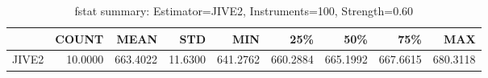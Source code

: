 \begin{table}[ht]
\centering
\caption{fstat summary: Estimator=JIVE2, Instruments=100, Strength=0.60}
\begin{tabular}{lrrrrrrrr}
\toprule
 & COUNT & MEAN & STD & MIN & 25\% & 50\% & 75\% & MAX \\
\midrule
JIVE2 & 10.0000 & 663.4022 & 11.6300 & 641.2762 & 660.2884 & 665.1992 & 667.6615 & 680.3118 \\
\bottomrule
\end{tabular}
\end{table}
